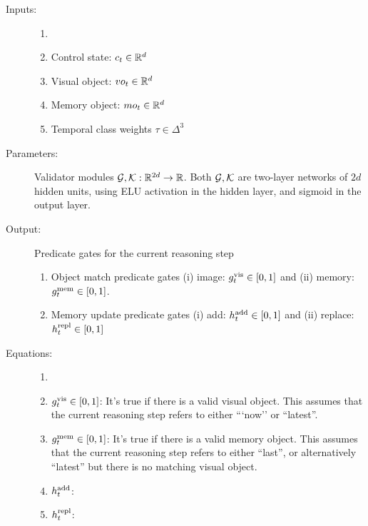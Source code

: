 

\begin{description}
	\item[Inputs:] 
	\begin{enumerate}
		\item[]
		\item Control state: $c_t \in \mathbb{R}^d$
		\item Visual object: $vo_t \in \mathbb{R}^d$
		\item Memory object: $mo_t \in \mathbb{R}^d$
		\item Temporal class weights $\tau \in \Delta^3$
	\end{enumerate}
	
	\item[Parameters:] Validator modules $\mathcal{G}, \mathcal{K}: \mathbb{R}^{2d} \to \mathbb{R}$.
	Both $\mathcal{G}, \mathcal{K}$ are two-layer networks of $2d$ hidden units,
	using ELU activation in the hidden layer, and sigmoid in the output layer.
	
	\item[Output:] Predicate gates for the current reasoning step
	\begin{enumerate}
    	\item Object match predicate gates (i) image: $g^{\mathrm{vis}}_t \in [0,1]$ and 
    	(ii) memory: $g^{\mathrm{mem}}_t \in [0,1]$.
		
		\item Memory update predicate gates (i) add: $h^{\mathrm{add}}_t \in [0,1]$ and
		(ii) replace: $h^{\mathrm{repl}}_t \in [0,1]$
    \end{enumerate}

	\item[Equations:]
	\begin{enumerate}
		\item[]
		\item $g^{\mathrm{vis}}_t \in [0,1]$:
		It's true if there is a valid visual object. This assumes that
		the current reasoning step refers to either ```now''  or ``latest''.
		
		\item$g^{\mathrm{mem}}_t \in [0,1]$:
		It's true if there is a valid memory object. This assumes that
		the current reasoning step refers to either ``last'',  or alternatively ``latest'' 
		but there is no matching visual object.
		
		\item $h^{\mathrm{add}}_t$:
		
		
		\item $h^{\mathrm{repl}}_t$: 
\end{enumerate}
\end{description}



